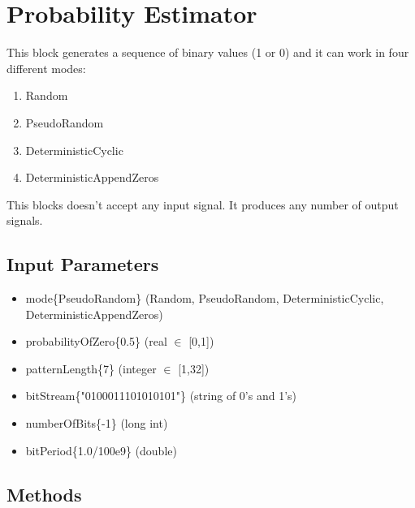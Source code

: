 \clearpage

\section{Probability Estimator}

\maketitle
This block generates a sequence of binary values (1 or 0) and it can work in four different modes:

\begin{multicols}{2}
\begin{enumerate}
	\item Random
	\item PseudoRandom
	\item DeterministicCyclic
	\item DeterministicAppendZeros
\end{enumerate}
\end{multicols}

This blocks doesn't accept any input signal. It produces any number of output signals.

\subsection*{Input Parameters}

	\begin{itemize}
		\item mode\{PseudoRandom\}\linebreak
		(Random, PseudoRandom, DeterministicCyclic, DeterministicAppendZeros)
		\item probabilityOfZero\{0.5\}\linebreak
		(real $\in$ [0,1])
		\item patternLength\{7\} \linebreak
		(integer $\in$ [1,32])
		\item bitStream\{"0100011101010101"\} \linebreak
		(string of 0's and 1's)
		\item numberOfBits\{-1\} \linebreak
		(long int)
		\item bitPeriod\{1.0/100e9\} \linebreak
		(double)
	\end{itemize}

\subsection*{Methods}

